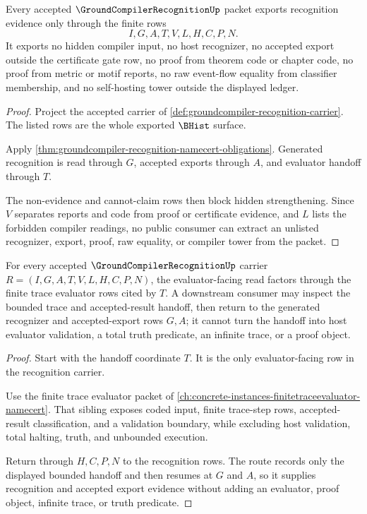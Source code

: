 \begin{theorem}
\label{thm:groundcompiler-recognition-ledger-nonescape}
Every accepted $\GroundCompilerRecognitionUp$ packet exports recognition evidence only through the finite rows
$$
I,G,A,T,V,L,H,C,P,N.
$$
It exports no hidden compiler input, no host recognizer, no accepted export outside the certificate gate row, no proof from theorem code or chapter code, no proof from metric or motif reports, no raw event-flow equality from classifier membership, and no self-hosting tower outside the displayed ledger.
\end{theorem}
\begin{proof}
Project the accepted carrier of \autoref{def:groundcompiler-recognition-carrier}. The listed rows are the whole exported $\BHist$ surface.

Apply \autoref{thm:groundcompiler-recognition-namecert-obligations}. Generated recognition is read through $G$, accepted exports through $A$, and evaluator handoff through $T$.

The non-evidence and cannot-claim rows then block hidden strengthening. Since $V$ separates reports and code from proof or certificate evidence, and $L$ lists the forbidden compiler readings, no public consumer can extract an unlisted recognizer, export, proof, raw equality, or compiler tower from the packet.
\end{proof}

\begin{theorem}
\label{thm:groundcompiler-recognition-finitetrace-handoff}
For every accepted $\GroundCompilerRecognitionUp$ carrier $R=(I,G,A,T,V,L,H,C,P,N)$, the evaluator-facing read factors through the finite trace evaluator rows cited by $T$. A downstream consumer may inspect the bounded trace and accepted-result handoff, then return to the generated recognizer and accepted-export rows $G,A$; it cannot turn the handoff into host evaluator validation, a total truth predicate, an infinite trace, or a proof object.
\end{theorem}
\begin{proof}
Start with the handoff coordinate $T$. It is the only evaluator-facing row in the recognition carrier.

Use the finite trace evaluator packet of \autoref{ch:concrete-instances-finitetraceevaluator-namecert}. That sibling exposes coded input, finite trace-step rows, accepted-result classification, and a validation boundary, while excluding host validation, total halting, truth, and unbounded execution.

Return through $H,C,P,N$ to the recognition rows. The route records only the displayed bounded handoff and then resumes at $G$ and $A$, so it supplies recognition and accepted export evidence without adding an evaluator, proof object, infinite trace, or truth predicate.
\end{proof}

